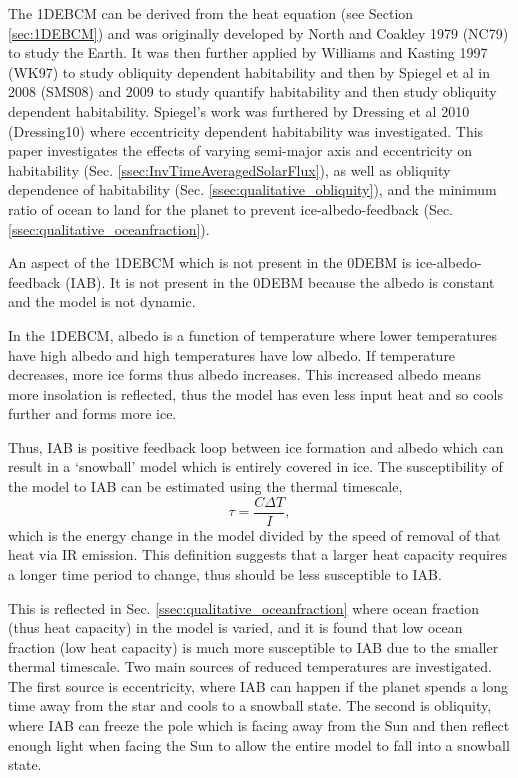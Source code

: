 \documentclass[12pt, onecolumn]{revtex4-2}    %
\begin{document}
The 1DEBCM can be derived from the heat equation (see Section \ref{sec:1DEBCM}) and was originally developed by North and Coakley 1979 (NC79) \cite{NC79} to study the Earth.
It was then further applied by Williams and Kasting 1997 (WK97) \cite{WK97} to study obliquity dependent habitability and then by Spiegel et al in 2008 (SMS08) \cite{SMS08} and 2009 \cite{SMS09} to study quantify habitability and then study obliquity dependent habitability.
Spiegel's work was furthered by Dressing et al 2010 (Dressing10) \cite{Dressing10} where eccentricity dependent habitability was investigated.
This paper investigates the effects of varying semi-major axis and eccentricity on habitability (Sec. \ref{ssec:InvTimeAveragedSolarFlux}), as well as obliquity dependence of habitability (Sec. \ref{ssec:qualitative_obliquity}), and the minimum ratio of ocean to land for the planet to prevent ice-albedo-feedback (Sec. \ref{ssec:qualitative_oceanfraction}).

%
An aspect of the 1DEBCM which is not present in the 0DEBM is ice-albedo-feedback (IAB).
It is not present in the 0DEBM because the albedo is constant and the model is not dynamic.

In the 1DEBCM, albedo is a function of temperature where lower temperatures have high albedo and high temperatures have low albedo.
If temperature decreases, more ice forms thus albedo increases.
This increased albedo means more insolation is reflected, thus the model has even less input heat and so cools further and forms more ice.

Thus, IAB is positive feedback loop between ice formation and albedo which can result in a `snowball' model which is entirely covered in ice.
The susceptibility of the model to IAB can be estimated using the thermal timescale,
\begin{equation}
  \tau = \frac{C \Delta T}{I},
  \label{eq:ThermalTimescale}
\end{equation}
which is the energy change in the model divided by the speed of removal of that heat via IR emission.
This definition suggests that a larger heat capacity requires a longer time period to change, thus should be less susceptible to IAB.

This is reflected in Sec. \ref{ssec:qualitative_oceanfraction} where ocean fraction (thus heat capacity) in the model is varied, and it is found that low ocean fraction (low heat capacity) is much more susceptible to IAB due to the smaller thermal timescale.
Two main sources of reduced temperatures are investigated.
The first source is eccentricity, where IAB can happen if the planet spends a long time away from the star and cools to a snowball state.
The second is obliquity, where IAB can freeze the pole which is facing away from the Sun and then reflect enough light when facing the Sun to allow the entire model to fall into a snowball state.
\end{document}
